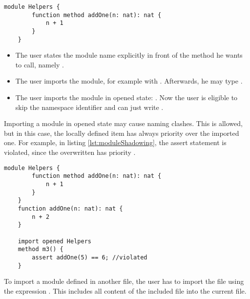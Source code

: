 \begin{lstlisting}[language=dafny, caption={Module Example}, captionpos=b, label={lst:addOneMethod}]
    module Helpers {
        function method addOne(n: nat): nat {
            n + 1
        }
    }
\end{lstlisting}

\begin{itemize}
    \item The user states the module name explicitly in front of the method he wants to call, \linebreak namely .
    \item The user imports the module, for example with .
    Afterwards, he may type .
    \item The user imports the module in opened state: .
    Now the user is eligible to skip the namespace identifier and can just write .
\end{itemize}

Importing a module in opened state may cause naming clashes.
This is allowed, but in this case, the locally defined item has always priority over the imported one.
For example, in listing \ref{lst:moduleShadowing}, the assert statement is violated, since the overwritten  has priority \cite{functionVSMethod}.

\begin{lstlisting}[language = dafny, caption={Naming Clash}, captionpos=b, label={lst:moduleShadowing}]
    module Helpers {
        function method addOne(n: nat): nat {
            n + 1
        }
    }
    function addOne(n: nat): nat {
        n + 2
    }

    import opened Helpers
    method m3() {
        assert addOne(5) == 6; //violated
    }

\end{lstlisting}

To import a module defined in another file, the user has to import the file using the expression .
This includes all content of the included file into the current file.

